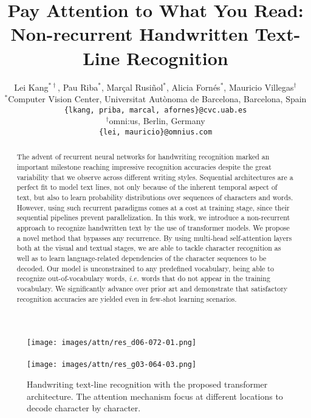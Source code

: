 \documentclass[10pt,twocolumn,letterpaper]{article}
\begin{document}
\title{Pay Attention to What You Read:\\ Non-recurrent Handwritten Text-Line Recognition}



\author{Lei Kang$^{* \dag}$, Pau Riba$^{*}$, Mar\c{c}al Rusi{\~n}ol$^{*}$, Alicia Forn\'{e}s$^{*}$,  Mauricio Villegas$^{\dag}$ \\
$^{*}$Computer Vision Center, Universitat Aut{\`o}noma de Barcelona, Barcelona, Spain\\
{\tt\small \{lkang, priba, marcal, afornes\}@cvc.uab.es}
\\
$^{\dag}$omni:us, Berlin, Germany\\
{\tt\small \{lei, mauricio\}@omnius.com}
}





\maketitle
\ifwacvfinal\thispagestyle{empty}\fi

\begin{abstract}
The advent of recurrent neural networks for handwriting recognition marked an important milestone reaching impressive recognition accuracies despite the great variability that we observe across different writing styles. Sequential architectures are a perfect fit to model text lines, not only because of the inherent temporal aspect of text, but also to learn probability distributions over sequences of characters and words. However, using such recurrent paradigms comes at a cost at training stage, since their sequential pipelines prevent parallelization. In this work, we introduce a non-recurrent approach to recognize handwritten text by the use of transformer models. We propose a novel method that bypasses any recurrence. By using multi-head self-attention layers both at the visual and textual stages, we are able to tackle character recognition as well as to learn language-related dependencies of the character sequences to be decoded. Our model is unconstrained to any predefined vocabulary, being able to recognize out-of-vocabulary words, \emph{i.e.} words that do not appear in the training vocabulary. We significantly advance over prior art and demonstrate that satisfactory recognition accuracies are yielded even in few-shot learning scenarios.
\end{abstract}




\begin{figure}
  \texttt{[image: images/attn/res\_d06-072-01.png]}\\
  \hfill\\
  \texttt{[image: images/attn/res\_g03-064-03.png]}
  \caption{Handwriting text-line recognition with the proposed transformer architecture. The attention mechanism focus at different locations to decode character by character.}
  \label{fig:teaser}
\end{figure}
\end{document}
